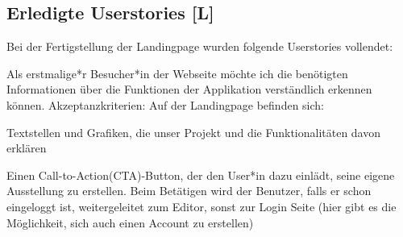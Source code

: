 \subsection{Erledigte Userstories [L]}
Bei der Fertigstellung der Landingpage wurden folgende Userstories vollendet: 
\begin{compactitem}
    \item Als erstmalige*r Besucher*in der Webseite möchte ich die benötigten Informationen über die Funktionen der Applikation verständlich erkennen können. Akzeptanzkriterien:
    Auf der Landingpage befinden sich:
    \begin{compactitem}
        \item Textstellen und Grafiken, die unser Projekt und die Funktionalitäten davon erklären
        \item Einen Call-to-Action(CTA)-Button, der den User*in dazu einlädt, seine eigene Ausstellung zu erstellen. Beim Betätigen wird der Benutzer, falls er schon eingeloggt ist, weitergeleitet zum Editor, sonst zur Login Seite (hier gibt es die Möglichkeit, sich auch einen Account zu erstellen)
    \end{compactitem}
\end{compactitem}

